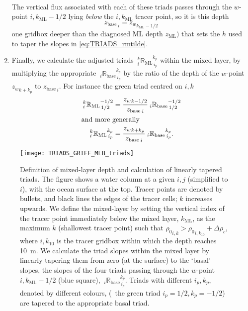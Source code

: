 \documentclass[../main/NEMO_manual]{subfiles}
\begin{document}
\begin{enumerate}
\begin{align*}
  \end{align*}
The vertical flux associated with each of these triads passes through
the $w$-point $i,k_{\mathrm{ML}}-1/2$ lying \emph{below} the $i,k_{\mathrm{ML}}$ tracer point, so it is this depth
\[
  {z_\mathrm{base}}_{\,i}={z_{w}}_{k_\mathrm{ML}-1/2}
\]
one gridbox deeper than the diagnosed ML depth $z_{\mathrm{ML}})$ that sets the $h$ used to taper the slopes in
\autoref{eq:TRIADS_rmtilde}.
\item Finally, we calculate the adjusted triads ${\:}_i^k{\mathbb{R}_{\mathrm{ML}}}_{\,i_p}^{k_p}$ within
  the mixed layer, by multiplying the appropriate ${\:}_i{\mathbb{R}_{\mathrm{base}}}_{\,i_p}^{k_p}$ by
  the ratio of the depth of the $w$-point ${z_w}_{k+k_p}$ to ${z_{\mathrm{base}}}_{\,i}$.
  For instance the green triad centred on $i,k$
  \begin{align*}
    {\:}_i^k{\mathbb{R}_{\mathrm{ML}}}_{\,1/2}^{-1/2} &=
                                                        \frac{{z_w}_{k-1/2}}{{z_{\mathrm{base}}}_{\,i}}{\:}_i{\mathbb{R}_{\mathrm{base}}}_{\,1/2}^{-1/2} \\
    \intertext{and more generally}
    {\:}_i^k{\mathbb{R}_{\mathrm{ML}}}_{\,i_p}^{k_p} &=
                                                       \frac{{z_w}_{k+k_p}}{{z_{\mathrm{base}}}_{\,i}}{\:}_i{\mathbb{R}_{\mathrm{base}}}_{\,i_p}^{k_p}.
  \end{align*}
\end{enumerate}

\begin{figure}[h]
  \centering
  \texttt{[image: TRIADS\_GRIFF\_MLB\_triads]}
  \caption[Definition of mixed-layer depth and calculation of linearly tapered triads]{
    Definition of mixed-layer depth and calculation of linearly tapered triads.
    The figure shows a water column at a given $i,j$ (simplified to $i$),
    with the ocean surface at the top.
    Tracer points are denoted by bullets, and black lines the edges of the tracer cells;
    $k$ increases upwards.
    \newline
    We define the mixed-layer by setting the vertical index of the tracer point immediately below
    the mixed layer, $k_{\mathrm{ML}}$, as the maximum $k$ (shallowest tracer point) such that
    ${\rho_0}_{i,k}>{\rho_0}_{i,k_{10}}+\Delta\rho_c$,
    where $i,k_{10}$ is the tracer gridbox within which the depth reaches 10~m.
    We calculate the triad slopes within the mixed layer by linearly tapering them from zero
    (at the surface) to the `basal' slopes,
    the slopes of the four triads passing through the $w$-point $i,k_{\mathrm{ML}}-1/2$ (blue square),
    ${\:}_i{\mathbb{R}_{\mathrm{base}}}_{\,i_p}^{k_p}$.
    Triads with different $i_p,k_p$, denoted by different colours,
    (\eg\ the green triad $i_p=1/2,k_p=-1/2$) are tapered to the appropriate basal triad.}
  \label{fig:TRIADS_MLB_triad}
\end{figure}
\end{document}
